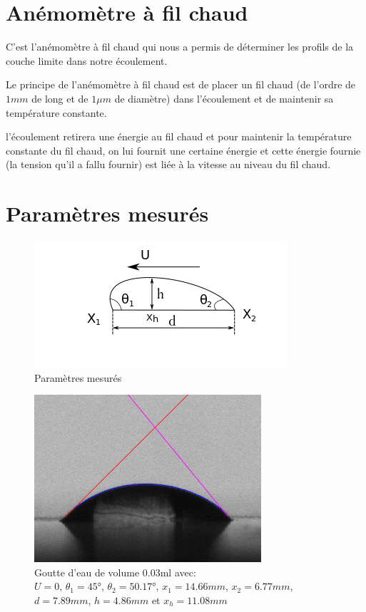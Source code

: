\section{Anémomètre à fil chaud}
C'est l'anémomètre à fil chaud qui nous a permis de déterminer les profils de la couche limite dans notre écoulement.

Le principe de l'anémomètre à fil chaud est de placer un fil chaud (de l'ordre de $1mm$ de long et de $1\mu m$ de diamètre) dans l'écoulement et de maintenir sa température constante.

l'écoulement retirera une énergie au fil chaud et pour maintenir la température constante du fil chaud, on lui fournit une certaine énergie et cette énergie fournie (la tension qu'il a fallu fournir) est liée à la vitesse au niveau du fil chaud.


\section{Paramètres mesurés}

\begin{figure}[!ht]
	\centering
	\includegraphics[scale = 1]{./gfx/rrgou2.png}
	\caption{Paramètres mesurés}
\end{figure}
\begin{figure}[!ht]
	\centering
	\includegraphics[scale = 0.5]{./gfx/crop_tvitesse=28_volume=003.png}
	\caption{Goutte d'eau de volume $0.03$ml avec: \\$U = 0$, $\theta_{1} = \ang{45}$, $\theta_{2} = \ang{50.17}$, $x_{1} = 14.66mm$, $x_{2} = 6.77mm$,\\ $d = 7.89mm$, $h = 4.86mm$ et $x_{h} = 11.08mm$}
\end{figure}


